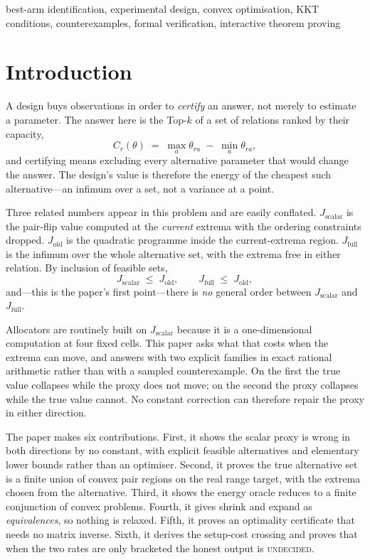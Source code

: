 \begin{IEEEkeywords}
best-arm identification, experimental design, convex optimisation, KKT conditions,
counterexamples, formal verification, interactive theorem proving
\end{IEEEkeywords}

\section{Introduction}

A design buys observations in order to \emph{certify} an answer, not merely to estimate a
parameter. The answer here is the Top-$k$ of a set of relations ranked by their capacity,
\begin{equation}
C_{r}(\theta)\;=\;\max_{a}\theta_{ra}\;-\;\min_{a}\theta_{ra},
\label{eq:capacity}
\end{equation}
and certifying means excluding every alternative parameter that would change the answer. The
design's value is therefore the energy of the cheapest such alternative---an infimum over a
set, not a variance at a point.

Three related numbers appear in this problem and are easily conflated.
$J_{\mathrm{scalar}}$ is the pair-flip value computed at the \emph{current} extrema with the
ordering constraints dropped. $J_{\mathrm{old}}$ is the quadratic programme inside the
current-extrema region. $J_{\mathrm{full}}$ is the infimum over the whole alternative set,
with the extrema free in either relation. By inclusion of feasible sets,
\begin{equation}
J_{\mathrm{scalar}}\;\leq\;J_{\mathrm{old}},
\qquad
J_{\mathrm{full}}\;\leq\;J_{\mathrm{old}},
\label{eq:order}
\end{equation}
and---this is the paper's first point---there is \emph{no} general order between
$J_{\mathrm{scalar}}$ and $J_{\mathrm{full}}$.

Allocators are routinely built on $J_{\mathrm{scalar}}$ because it is a one-dimensional
computation at four fixed cells. This paper asks what that costs when the extrema can move,
and answers with two explicit families in exact rational arithmetic rather than with a
sampled counterexample. On the first the true value collapses while the proxy does not move;
on the second the proxy collapses while the true value cannot. No constant correction can
therefore repair the proxy in either direction.

The paper makes six contributions. First, it shows the scalar proxy is wrong in both
directions by no constant, with explicit feasible alternatives and elementary lower bounds
rather than an optimiser. Second, it proves the true alternative set is a finite union of
convex pair regions on the real range target, with the extrema chosen from the alternative.
Third, it shows the energy oracle reduces to a finite conjunction of convex problems. Fourth,
it gives shrink and expand as \emph{equivalences}, so nothing is relaxed. Fifth, it proves an
optimality certificate that needs no matrix inverse. Sixth, it derives the setup-cost
crossing and proves that when the two rates are only bracketed the honest output is
\textsc{undecided}.

